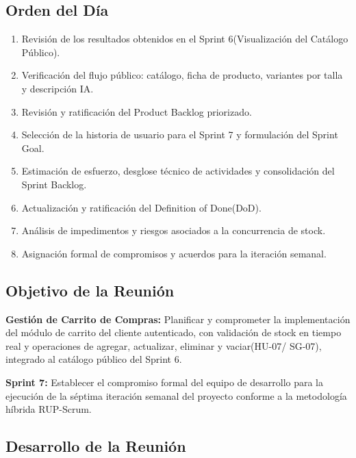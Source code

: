 \documentclass[12pt,a4paper]{article}
\begin{document}
\subsection*{Orden del Día}

\begin{enumerate}
    \item Revisión de los resultados obtenidos en el Sprint 6(Visualización del Catálogo Público).
    \item Verificación del flujo público: catálogo, ficha de producto, variantes por talla y descripción IA.
    \item Revisión y ratificación del Product Backlog priorizado.
    \item Selección de la historia de usuario para el Sprint 7 y formulación del Sprint Goal.
    \item Estimación de esfuerzo, desglose técnico de actividades y consolidación del Sprint Backlog.
    \item Actualización y ratificación del Definition of Done(DoD).
    \item Análisis de impedimentos y riesgos asociados a la concurrencia de stock.
    \item Asignación formal de compromisos y acuerdos para la iteración semanal.
\end{enumerate}

\subsection*{Objetivo de la Reunión}

\textbf{Gestión de Carrito de Compras:} Planificar y comprometer la implementación del módulo de carrito del cliente autenticado, con validación de stock en tiempo real y operaciones de agregar, actualizar, eliminar y vaciar(HU-07/ SG-07), integrado al catálogo público del Sprint 6.

\textbf{Sprint 7:} Establecer el compromiso formal del equipo de desarrollo para la ejecución de la séptima iteración semanal del proyecto conforme a la metodología híbrida RUP-Scrum.

\subsection*{Desarrollo de la Reunión}
\end{document}
